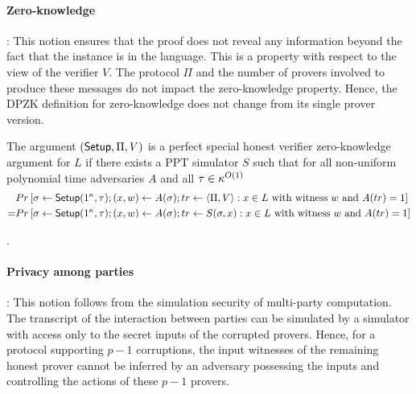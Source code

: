 \paragraph{Zero-knowledge}: 
This notion ensures that the proof does not reveal any information beyond the fact that the instance is in the language.
This is a property with respect to the view of the verifier $V$. The protocol $\Pi$ and the number of provers involved to produce these messages do not impact the zero-knowledge property. Hence, the DPZK definition for zero-knowledge does not change from its single prover version.
\begin{definition}
The argument $(\mathsf{Setup}, \Pi, V)$ is a perfect special honest verifier zero-knowledge argument for $L$ if there exists a PPT simulator $S$ such that for all non-uniform polynomial time adversaries $A$ and all $\tau \in {\kappa}^{O(1)}$ 
\begin{align*}
&Pr \left[ \sigma \leftarrow \mathsf{Setup}(1^{\kappa}, \tau); (x,w) \leftarrow A(\sigma); tr \leftarrow \langle \Pi, V \rangle: x \in L \text{ with witness } w \text{ and } A(tr)=1 \right] \\
= &Pr \left[\sigma \leftarrow \mathsf{Setup}(1^{\kappa}, \tau); (x,w) \leftarrow A(\sigma); tr \leftarrow S(\sigma,x): x \in L \text{ with witness } w \text{ and } A(tr) = 1 \right]
\end{align*}
\end{definition}
.

\paragraph{Privacy among parties}:
This notion follows from the simulation security of multi-party computation. The transcript of the interaction between parties can be simulated by a simulator with access only to the secret inputs of the corrupted provers. Hence, for a protocol supporting $p-1$ corruptions, the input witnesses of the remaining honest prover cannot be inferred by an adversary possessing the inputs and controlling the actions of these $p-1$ provers.

